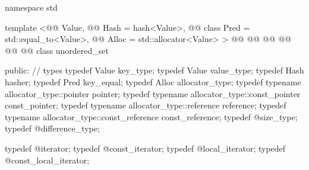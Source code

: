\documentclass[american,twoside]{book}
\begin{document}
%
\begin{codeblock}
namespace std {
  template <@@ Value,
            @@ Hash = hash<Value>,
            @@ class Pred = std::equal_to<Value>,
            @@ Alloc = std::allocator<Value> >
  @@
           @@
           @@
           @@
           @@
           @@
  class unordered_set
  {
  public:
    // types
    typedef Value                                    key_type;
    typedef Value                                    value_type;
    typedef Hash                                     hasher;
    typedef Pred                                     key_equal;
    typedef Alloc                                    allocator_type;
    typedef typename allocator_type::pointer         pointer;
    typedef typename allocator_type::const_pointer   const_pointer;
    typedef typename allocator_type::reference       reference;
    typedef typename allocator_type::const_reference const_reference;
    typedef @\impdef@                   size_type;
    typedef @\impdef@                   difference_type;

    typedef @\impdef@                   iterator;
    typedef @\impdef@                   const_iterator;
    typedef @\impdef@                   local_iterator;
    typedef @\impdef@                   const_local_iterator;

}}
\end{codeblock}
\end{document}
